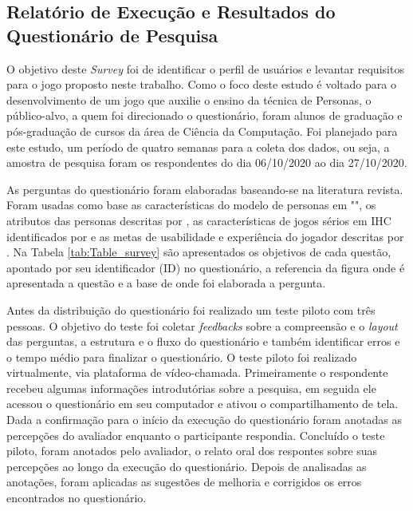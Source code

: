 \begin{apendicesenv}
\chapter{Relatório de Execução e Resultados do Questionário de Pesquisa}
\label{ap:res_quest}

O objetivo deste \textit{Survey} foi de identificar o perfil de usuários e levantar requisitos para o jogo proposto neste trabalho. Como o foco deste estudo é voltado para o desenvolvimento de um jogo que auxilie o ensino da técnica de Personas, o público-alvo, a quem foi direcionado o questionário, foram alunos de graduação e pós-graduação de cursos da área de Ciência da Computação. Foi planejado para este estudo, um período de quatro semanas para a coleta dos dados, ou seja, a amostra de pesquisa foram os respondentes do dia 06/10/2020 ao dia 27/10/2020. 

As perguntas do questionário foram elaboradas baseando-se na literatura revista. Foram usadas como base as características do modelo de personas em "\citeauthor{usability2020}", os atributos das personas descritas por , as características de jogos sérios em IHC identificados por  e as metas de usabilidade e experiência do jogador descritas por . Na Tabela \ref{tab:Table_survey} são apresentados os objetivos de cada questão, apontado por seu identificador (ID) no questionário, a referencia da figura onde é apresentada a questão e a base de onde foi elaborada a pergunta.



Antes da distribuição do questionário foi realizado um teste piloto com três pessoas. O objetivo do teste foi coletar \textit{feedbacks} sobre a compreensão e o \textit{layout} das perguntas, a estrutura e o fluxo do questionário e também identificar erros e o tempo médio para finalizar o questionário. O teste piloto foi realizado virtualmente, via plataforma de vídeo-chamada. Primeiramente o respondente recebeu algumas informações introdutórias sobre a pesquisa, em seguida ele acessou o questionário em seu computador e ativou o compartilhamento de tela. Dada a confirmação para o início da execução do questionário foram anotadas as percepções do avaliador enquanto o participante respondia. Concluído o teste piloto, foram anotados pelo avaliador, o relato oral dos respontes sobre suas percepções ao longo da execução do questionário. Depois de analisadas as anotações, foram aplicadas as sugestões de melhoria e corrigidos os erros encontrados no questionário. 


\end{apendicesenv}
